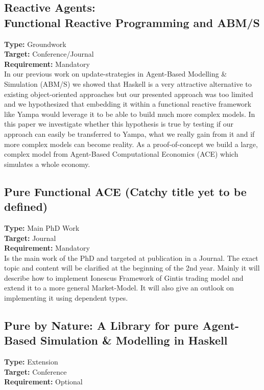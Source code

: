 \subsection{Reactive Agents:\\Functional Reactive Programming and ABM/S}
\textbf{Type:} Groundwork \\
\textbf{Target:} Conference/Journal \\
\textbf{Requirement:} Mandatory \\

In our previous work on update-strategies in Agent-Based Modelling \& Simulation (ABM/S) we showed that Haskell is a very attractive alternative to existing object-oriented approaches but our presented approach was too limited and we hypothesized that embedding it within a functional reactive framework like Yampa would leverage it to be able to build much more complex models. In this paper we investigate whether this hypothesis is true by testing if our approach can easily be transferred to Yampa, what we really gain from it and if more complex models can become reality. As a proof-of-concept we build a large, complex model from Agent-Based Computational Economics (ACE) which simulates a whole economy.





\subsection{Pure Functional ACE (Catchy title yet to be defined)}
\textbf{Type:} Main PhD Work \\
\textbf{Target:} Journal \\
\textbf{Requirement:} Mandatory \\

Is the main work of the PhD and targeted at publication in a Journal. The exact topic and content will be clarified at the beginning of the 2nd year. Mainly it will describe how to implement Ionescus Framework of Gintis trading model and extend it to a more general Market-Model. It will also give an outlook on implementing it using dependent types.

\subsection{Pure by Nature: A Library for pure Agent-Based Simulation \& Modelling in Haskell}
\textbf{Type:} Extension \\
\textbf{Target:} Conference \\
\textbf{Requirement:} Optional \\


